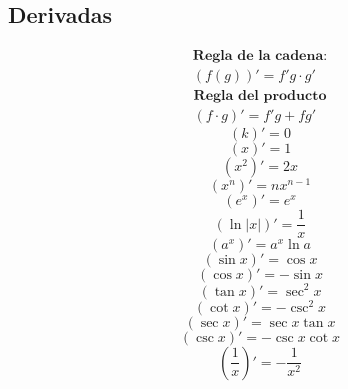 \documentclass[a4paper,12pt,numbers=noenddot]{scrreprt}
\begin{document}
\subsection*{Derivadas}
        \begin{center} 
    \begin{multicols}{4}
        \begin{align*}       
        \textbf{Regla de la cadena:}\\ (f(g))' = f'g \cdot g'
        \end{align*}
        \begin{align*}       
            \textbf{Regla del producto}\\ (f \cdot g)' = f'g + fg'
        \end{align*}
        \begin{equation*}
            (k)' = 0
        \end{equation*}
        \begin{equation*}
            (x)' = 1
        \end{equation*}
        \begin{equation*}
            (x^2)' = 2x
        \end{equation*}
        \begin{equation*}
            (x^n)' = nx^{n-1}
        \end{equation*}
        \begin{equation*}
            (e^x)' = e^x
        \end{equation*}
        \begin{equation*}
            (\ln |x|)' = \frac{1}{x}
        \end{equation*}
        \begin{equation*}
            (a^x)' = a^x \ln a
        \end{equation*}
        \begin{equation*}
            (\sin x)' = \cos x
        \end{equation*}
        \begin{equation*}
            (\cos x)' = -\sin x
        \end{equation*}
        \begin{equation*}
            (\tan x)' = \sec^2 x
        \end{equation*}
        \begin{equation*}
            (\cot x)' = -\csc^2 x
        \end{equation*}
        \begin{equation*}
            (\sec x)' = \sec x \tan x
        \end{equation*}
        \begin{equation*}
            (\csc x)' = -\csc x \cot x
        \end{equation*}
        \begin{equation*}
            (\frac{1}{x})' = -\frac{1}{x^2}
        \end{equation*} 
    \end{multicols}
\end{center}
    \newpage
\end{document}
